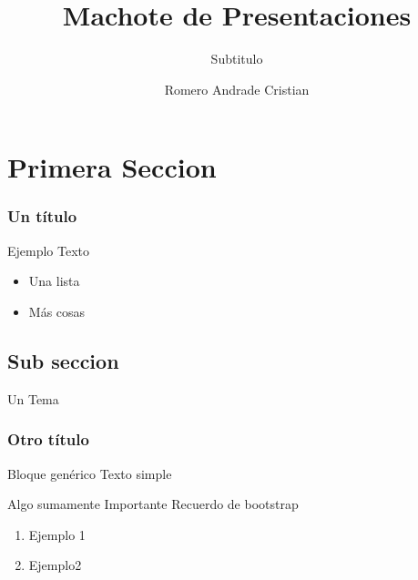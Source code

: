 \documentclass{beamer}
\begin{document}
\title[Machote]{Machote de Presentaciones}

\subtitle{Subtitulo}

\author[Cristian]{Romero Andrade Cristian}


\frame{\titlepage}
\frame{\tableofcontents}

\section{Primera Seccion}

\frame{\tableofcontents[currentsection]}


\begin{frame}
  \frametitle{Un título}

  Ejemplo Texto

  \begin{itemize}
  \item Una lista\pause{}
  \item Más cosas
  \end{itemize}
\end{frame}

\subsection{Sub seccion} %

\begin{frame}{Un Tema}
  \frametitle{Otro título}
  \begin{block}{Bloque genérico}
    Texto simple
  \end{block}\pause{}
  
  \begin{alertblock}{Algo sumamente Importante}
    Recuerdo de bootstrap
  \end{alertblock}
  
  \begin{examples}
    \begin{enumerate}
    \item Ejemplo 1\pause{}
    \item Ejemplo2
    \end{enumerate}
  \end{examples}
\end{frame}

\end{document}
